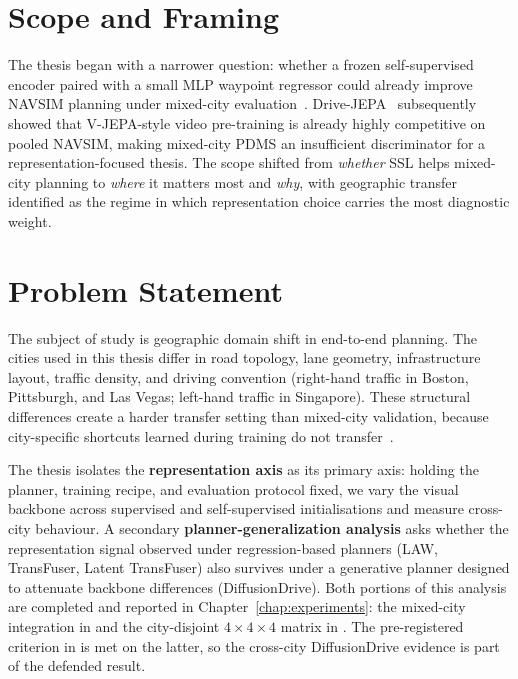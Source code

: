 \section{Scope and Framing}
\label{sec:project-evolution}

The thesis began with a narrower question: whether a frozen self-supervised encoder paired with a small MLP waypoint regressor could already improve NAVSIM planning under mixed-city evaluation~\cite{hamza-sanchez-navsim-report}. Drive-JEPA~\cite{wang-drive-jepa} subsequently showed that V-JEPA-style video pre-training is already highly competitive on pooled NAVSIM, making mixed-city PDMS an insufficient discriminator for a representation-focused thesis. The scope shifted from \emph{whether} SSL helps mixed-city planning to \emph{where} it matters most and \emph{why}, with geographic transfer identified as the regime in which representation choice carries the most diagnostic weight.

\section{Problem Statement}
\label{sec:problem}

The subject of study is geographic domain shift in end-to-end planning. The cities used in this thesis differ in road topology, lane geometry, infrastructure layout, traffic density, and driving convention (right-hand traffic in Boston, Pittsburgh, and Las Vegas; left-hand traffic in Singapore). These structural differences create a harder transfer setting than mixed-city validation, because city-specific shortcuts learned during training do not transfer~\cite{naeinian-cross-city-2026}.

The thesis isolates the \textbf{representation axis} as its primary axis: holding the planner, training recipe, and evaluation protocol fixed, we vary the visual backbone across supervised and self-supervised initialisations and measure cross-city behaviour. A secondary \textbf{planner-generalization analysis} asks whether the representation signal observed under regression-based planners (LAW, TransFuser, Latent TransFuser) also survives under a generative planner designed to attenuate backbone differences (DiffusionDrive). Both portions of this analysis are completed and reported in Chapter~\ref{chap:experiments}: the mixed-city integration in  and the city-disjoint $4 \times 4 \times 4$ matrix in . The pre-registered criterion in  is met on the latter, so the cross-city DiffusionDrive evidence is part of the defended result.


